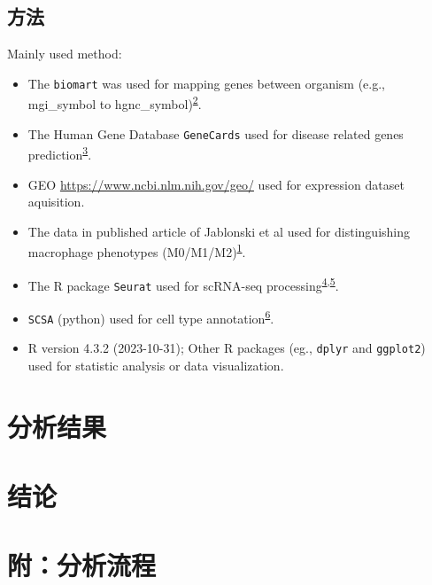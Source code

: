 \documentclass[
]{article}
\providecommand{\tightlist}{%
  \setlength{\itemsep}{0pt}\setlength{\parskip}{0pt}}
\begin{document}
\hypertarget{ux65b9ux6cd5}{%
\subsection{方法}\label{ux65b9ux6cd5}}

Mainly used method:

\begin{itemize}
\tightlist
\item
  The \texttt{biomart} was used for mapping genes between organism (e.g., mgi\_symbol to hgnc\_symbol)\textsuperscript{\protect\hyperlink{ref-MappingIdentifDurinc2009}{2}}.
\item
  The Human Gene Database \texttt{GeneCards} used for disease related genes prediction\textsuperscript{\protect\hyperlink{ref-TheGenecardsSStelze2016}{3}}.
\item
  GEO \url{https://www.ncbi.nlm.nih.gov/geo/} used for expression dataset aquisition.
\item
  The data in published article of Jablonski et al used for distinguishing macrophage phenotypes (M0/M1/M2)\textsuperscript{\protect\hyperlink{ref-NovelMarkersTJablon2015}{1}}.
\item
  The R package \texttt{Seurat} used for scRNA-seq processing\textsuperscript{\protect\hyperlink{ref-IntegratedAnalHaoY2021}{4},\protect\hyperlink{ref-ComprehensiveIStuart2019}{5}}.
\item
  \texttt{SCSA} (python) used for cell type annotation\textsuperscript{\protect\hyperlink{ref-ScsaACellTyCaoY2020}{6}}.
\item
  R version 4.3.2 (2023-10-31); Other R packages (eg., \texttt{dplyr} and \texttt{ggplot2}) used for statistic analysis or data visualization.
\end{itemize}

\hypertarget{results}{%
\section{分析结果}\label{results}}

\hypertarget{dis}{%
\section{结论}\label{dis}}

\hypertarget{workflow}{%
\section{附：分析流程}\label{workflow}}
\end{document}
